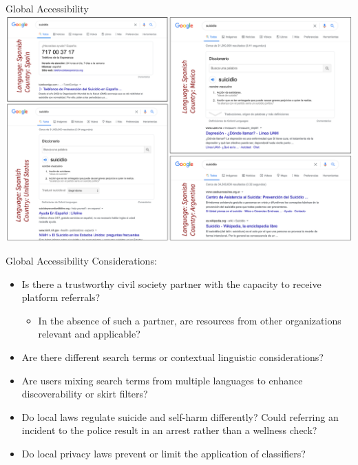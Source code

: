 \documentclass[nobackground,dvipsnames,table]{beamer}
\begin{document}
\begin{frame}{Global Accessibility}
    \centering
    \includegraphics[width=\textwidth]{global-accessibility}
\end{frame}

\begin{frame}{Global Accessibility}
    Considerations:
    \begin{itemize}
        \item Is there a trustworthy civil society partner with the capacity to receive platform referrals?
        \begin{itemize}
            \item In the absence of such a partner, are resources from other organizations relevant and applicable?
        \end{itemize}
        \item Are there different search terms or contextual linguistic considerations?
        \item Are users mixing search terms from multiple languages to enhance discoverability or skirt filters?
        \item Do local laws regulate suicide and self-harm differently? Could referring an incident to the police result in an arrest rather than a wellness check?
        \item Do local privacy laws prevent or limit the application of classifiers?
    \end{itemize}
\end{frame}
\end{document}
